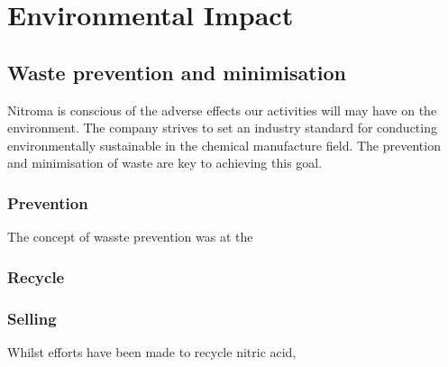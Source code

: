 \section{Environmental Impact}

\subsection{Waste prevention and minimisation }

Nitroma is conscious of the adverse effects our activities will may have on the environment. The company strives to set an industry standard for conducting environmentally sustainable in the chemical manufacture field. The prevention and minimisation of waste are key to achieving this goal. 

\subsubsection{Prevention}

The concept of wasste prevention was at the 


\subsubsection{Recycle}





\subsubsection{Selling}

Whilst efforts have been made to recycle nitric acid, 